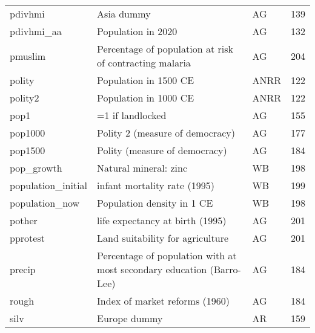 \begin{tabular}{lllr}
pdivhmi                        &                                                                Asia dummy &     AG &   139 \\
pdivhmi\_aa                     &                                                        Population in 2020 &     AG &   132 \\
pmuslim                        &                   Percentage of population at risk of contracting malaria &     AG &   204 \\
polity                         &                                                     Population in 1500 CE &   ANRR &   122 \\
polity2                        &                                                     Population in 1000 CE &   ANRR &   122 \\
pop1                           &                                                          =1 if landlocked &     AG &   155 \\
pop1000                        &                                           Polity 2 (measure of democracy) &     AG &   177 \\
pop1500                        &                                             Polity (measure of democracy) &     AG &   184 \\
pop\_growth                     &                                                     Natural mineral: zinc &     WB &   198 \\
population\_initial             &                                              infant mortality rate (1995) &     WB &   199 \\
population\_now                 &                                                Population density in 1 CE &     WB &   198 \\
pother                         &                                           life expectancy at birth (1995) &     AG &   201 \\
pprotest                       &                                          Land suitability for agriculture &     AG &   201 \\
precip                         &     Percentage of population with at most secondary education (Barro-Lee) &     AG &   184 \\
rough                          &                                            Index of market reforms (1960) &     AG &   184 \\
silv                           &                                                              Europe dummy &     AR &   159 \\

\end{tabular}
